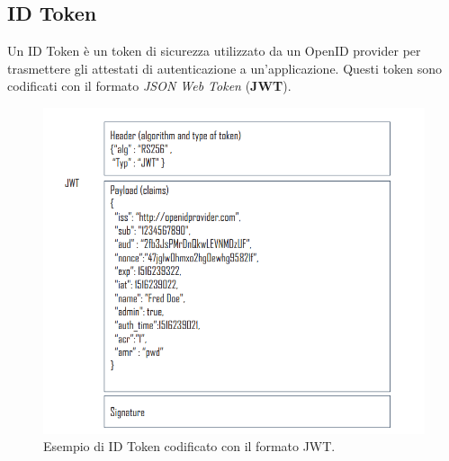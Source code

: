 \subsection{ID Token}

Un ID Token è un token di sicurezza utilizzato da un OpenID provider per trasmettere
gli attestati di autenticazione a un'applicazione. Questi token sono codificati
con il formato \textit{JSON Web Token} (\textbf{JWT}).

\begin{figure}[H]
    \centering
    \includegraphics[width=\textwidth, keepaspectratio]{capitoli/id_managing/imgs/jwt.png}
    \caption{Esempio di ID Token codificato con il formato JWT.}
\end{figure}

